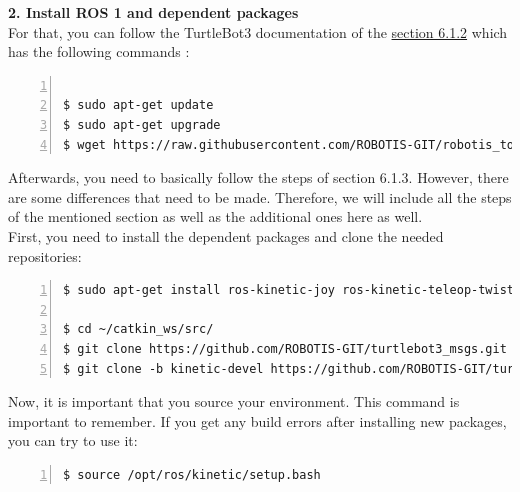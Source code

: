 \documentclass[plainarticle,zihtitle,english,final,hyperref,utf8]{zihpub}
\begin{document}
\textbf{2. Install ROS 1 and dependent packages}\\
\newline
For that, you can follow the TurtleBot3 documentation of the \href{https://emanual.robotis.com/docs/en/platform/turtlebot3/pc\_setup/\#install-ubuntu-on-remote-pc}{section 6.1.2} which has the following commands \cite{ros1doc}: 

\begin{Verbatim}[breaklines=true, breakanywhere=true, baselinestretch=1,fontsize=\scriptsize,numbers=left,frame=single,stepnumber=5,xleftmargin=1cm,xrightmargin=1cm]

$ sudo apt-get update
$ sudo apt-get upgrade
$ wget https://raw.githubusercontent.com/ROBOTIS-GIT/robotis_tools/master/install_ros_kinetic.sh && chmod 755 ./install_ros_kinetic.sh && bash ./install_ros_kinetic.sh

\end{Verbatim}

Afterwards, you need to basically follow the steps of section 6.1.3. However, there are some differences that need to be made. Therefore, we will include all the steps of the mentioned section as well as the additional ones here as well.\\
\newline
First, you need to install the dependent packages and clone the needed repositories:
\begin{Verbatim}[breaklines=true, breakanywhere=true, baselinestretch=1,fontsize=\scriptsize,numbers=left,frame=single,stepnumber=5,xleftmargin=1cm,xrightmargin=1cm]
$ sudo apt-get install ros-kinetic-joy ros-kinetic-teleop-twist-joy ros-kinetic-teleop-twist-keyboard ros-kinetic-laser-proc ros-kinetic-rgbd-launch ros-kinetic-depthimage-to-laserscan ros-kinetic-rosserial-arduino ros-kinetic-rosserial-python ros-kinetic-rosserial-server ros-kinetic-rosserial-client ros-kinetic-rosserial-msgs ros-kinetic-amcl ros-kinetic-map-server ros-kinetic-move-base ros-kinetic-urdf ros-kinetic-xacro ros-kinetic-compressed-image-transport ros-kinetic-rqt-image-view ros-kinetic-gmapping ros-kinetic-navigation ros-kinetic-interactive-markers
        
$ cd ~/catkin_ws/src/
$ git clone https://github.com/ROBOTIS-GIT/turtlebot3_msgs.git
$ git clone -b kinetic-devel https://github.com/ROBOTIS-GIT/turtlebot3.git
    \end{Verbatim}
    
Now, it is important that you source your environment. This command is important to remember. If you get any build errors after installing new packages, you can try to use it:
\begin{Verbatim}[breaklines=true, breakanywhere=true, baselinestretch=1,fontsize=\scriptsize,numbers=left,frame=single,stepnumber=5,xleftmargin=1cm,xrightmargin=1cm]
$ source /opt/ros/kinetic/setup.bash
    \end{Verbatim}
\end{document}
